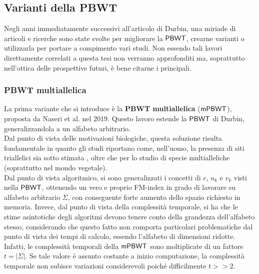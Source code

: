 \subsection{Varianti della PBWT}
Negli anni immediatamente successivi all'articolo di Durbin, una miriade di
articoli e ricerche sono state svolte per migliorare la $\mbox{\rm {\sf PBWT}}$, crearne
varianti o utilizzarla per portare a compimento vari studi. Non essendo tali
lavori direttamente correlati a questa tesi non 
verranno approfonditi ma, soprattutto nell'ottica delle prospettive futuri, è
bene citarne i principali.
\subsubsection{PBWT multiallelica}
La prima variante che si introduce è la \textbf{PBWT multiallelica} ($\mbox{\rm {\sf mPBWT}}$),
proposta da Naseri et al. \cite{mpbwt} nel 2019. Questo 
lavoro estende la $\mbox{\rm {\sf PBWT}}$ di Durbin, generalizzandola a un alfabeto
arbitrario. \\
Dal punto di vista delle motivazioni biologiche, questa soluzione risulta
fondamentale in quanto gli studi riportano come, nell'uomo, la presenza di
siti triallelici sia sotto stimata \cite{tri} \cite{tri2}, oltre che per lo
studio di specie multialleliche (soprattutto nel
mondo vegetale). \\
Dal punto di vista algoritmico, si sono generalizzati i concetti di
$c$, $u_k$ e $v_k$ visti nella $\mbox{\rm {\sf PBWT}}$, ottenendo un vero e proprio
FM-index in grado di lavorare su alfabeto arbitrario $\Sigma$, con
conseguente forte aumento dello spazio richiesto in memoria. Invece, dal punto
di vista della complessità temporale, si ha che le stime asintotiche
degli 
algoritmi devono tenere conto della grandezza dell'alfabeto stesso, considerando
che questo fatto non
comporta particolari problematiche dal punto di vista dei tempi di
calcolo, essendo l'alfabeto di dimensioni ridotte. Infatti, le complessità
temporali della $\mbox{\rm {\sf mPBWT}}$ sono moltiplicate
di un fattore $t=\left|\Sigma\right|$. Se tale valore è assunto
costante a inizio computazione, la
complessità temporale non subisce variazioni considerevoli poiché
difficilmente $t>>2$.
